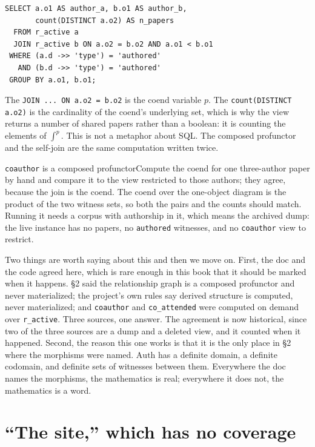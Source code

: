 \begin{lstlisting}
SELECT a.o1 AS author_a, b.o1 AS author_b,
       count(DISTINCT a.o2) AS n_papers
  FROM r_active a
  JOIN r_active b ON a.o2 = b.o2 AND a.o1 < b.o1
 WHERE (a.d ->> 'type') = 'authored'
   AND (b.d ->> 'type') = 'authored'
 GROUP BY a.o1, b.o1;
\end{lstlisting}

The \verb|JOIN ... ON a.o2 = b.o2| is the coend variable $p$. The \verb|count(DISTINCT a.o2)| is the cardinality of the coend's underlying set, which is why the view returns a number of shared papers rather than a boolean: it is counting the elements of $\int^p$. This is not a metaphor about SQL. The composed profunctor and the self-join are the same computation written twice.

\begin{Correspondence}{\texttt{coauthor} is a composed profunctor}{Compute the coend for one three-author paper by hand and compare it to the view restricted to those authors; they agree, because the join is the coend.}
The coend over the one-object diagram is the product of the two witness sets, so both the pairs and the counts should match. Running it needs a corpus with authorship in it, which means the archived dump: the live instance has no papers, no \texttt{authored} witnesses, and no \texttt{coauthor} view to restrict.
\end{Correspondence}

Two things are worth saying about this and then we move on. First, the doc and the code agreed here, which is rare enough in this book that it should be marked when it happens. \S2 said the relationship graph is a composed profunctor and never materialized; the project's own rules say derived structure is computed, never materialized; and \verb|coauthor| and \verb|co_attended| were computed on demand over \verb|r_active|. Three sources, one answer. The agreement is now historical, since two of the three sources are a dump and a deleted view, and it counted when it happened. Second, the reason this one works is that it is the only place in \S2 where the morphisms were named. $\mathrm{Auth}$ has a definite domain, a definite codomain, and definite sets of witnesses between them. Everywhere the doc names the morphisms, the mathematics is real; everywhere it does not, the mathematics is a word.

\section{``The site,'' which has no coverage}

